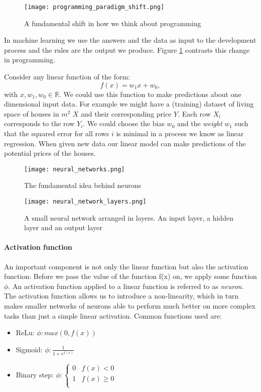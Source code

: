 \begin{figure}
    \centering
    \texttt{[image: programming\_paradigm\_shift.png]}
    \caption{A fundamental shift in how we think about programming \cite[p. 5f.]{moroney_ai_2020}}
    \label{programming_paradigm_shift}
\end{figure}

In machine learning we use the answers and the data as input to the development process and the rules are the output we produce. Figure \ref{programming_paradigm_shift} contrasts this change in programming.

Consider any linear function of the form:
$$
    f(x) = w_1x + w_0,
$$
with $ x, w_1, w_0 \in \mathbb{R} $. We could use this function to make predictions about one dimensional input data. For example we might have a (training) dataset of living space of houses in $ m^2 $ $ X $ and their corresponding price $ Y $. Each row $X_i$ corresponds to the row $Y_i$. We could choose the bias $ w_0 $ and the \textit{weight} $ w_1 $ such that the squared error for all rows $i$ is minimal in a process we know as linear regression. When given new data our linear model can make predictions of the potential prices of the houses.


\begin{figure}
    \centering
    \texttt{[image: neural\_networks.png]}
    \caption{The fundamental idea behind neurons}
    \label{neural_network}
\end{figure}

\begin{figure}
    \centering
    \texttt{[image: neural\_network\_layers.png]}
    \caption{A small neural network arranged in layers. An input layer, a hidden layer and an output layer}
    \label{neural_network_layers}
\end{figure}

\paragraph{Activation function}
An important component is not only the linear function but also the activation function: Before we pass the value of the function f(x) on, we apply some function $ \phi $. An activation function applied to a linear function is referred to as \textit{neuron}. The activation function allows us to introduce a non-linearity, which in turn makes smaller networks of neurons able to perform much better on more complex tasks than just a simple linear activation. Common functions used are:
\begin{itemize}
    \item ReLu: $ \phi : max(0, f(x)) $
    \item Sigmoid: $ \phi : \frac{1}{1 + e^{f(x)}} $
    \item Binary step: $ \phi : \begin{cases}
                  0 & f(x) < 0    \\
                  1 & f(x) \geq 0 \\
              \end{cases}$
\end{itemize}

